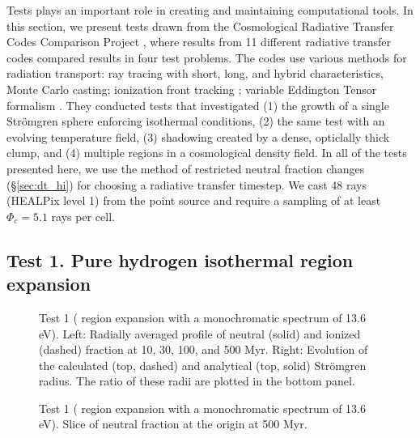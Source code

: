 \documentclass[12pt,preprint]{aastex}
\begin{document}
Tests plays an important role in creating and maintaining
computational tools.  In this section, we present tests drawn from the
Cosmological Radiative Transfer Codes Comparison Project
\citep[][hereafter RT06]{RT06}, where results from 11 different
radiative transfer codes compared results in four test problems.  The
codes use various methods for radiation transport: ray tracing with
short, long, and hybrid characteristics, Monte Carlo casting;
ionization front tracking \citep{Alvarez06_IFT}; variable Eddington
Tensor formalism \citep{Gnedin01_OTVET}.  They conducted tests that
investigated (1) the growth of a single Str\"{o}mgren sphere enforcing
isothermal conditions, (2) the same test with an evolving temperature
field, (3) shadowing created by a dense, opticlally thick clump, and
(4) multiple  regions in a cosmological density field.  In
all of the tests presented here, we use the method of restricted
neutral fraction changes (\S\ref{sec:dt_hi}) for choosing a radiative
transfer timestep.  We cast 48 rays (HEALPix level 1) from the point
source and require a sampling of at least $\Phi_c = 5.1$ rays per
cell.

\subsection{Test 1. Pure hydrogen isothermal  region
  expansion}
\label{sec:test1}

\begin{figure}[t]
  \caption{\label{fig:test1_ifront} Test 1 ( region
    expansion with a monochromatic spectrum of 13.6 eV).  Left:
    Radially averaged profile of neutral (solid) and ionized (dashed)
    fraction at 10, 30, 100, and 500 Myr.  Right: Evolution of the
    calculated (top, dashed) and analytical (top, solid) Str\"{o}mgren
    radius.  The ratio of these radii are plotted in the bottom panel.}
\end{figure}

\begin{figure}[t]
  \caption{\label{fig:test1_HI} Test 1 ( region expansion
    with a monochromatic spectrum of 13.6 eV). Slice of neutral
    fraction at the origin at 500 Myr.}
\end{figure}
\end{document}
